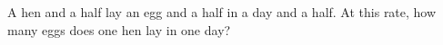 A hen and a half lay an egg and a half in a day and a half. At this rate, how many eggs does one hen lay in one day?
